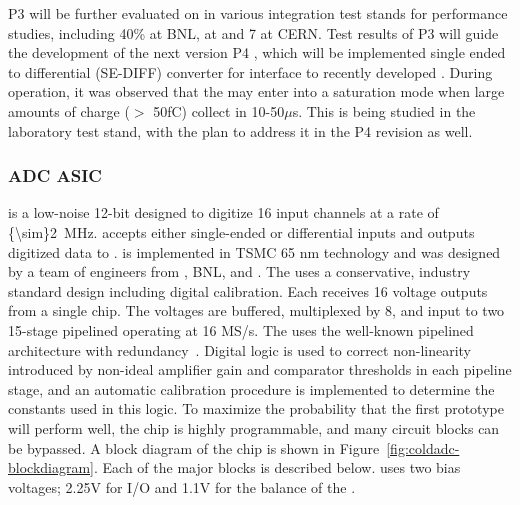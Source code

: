 P3   will be further evaluated on  in various integration test stands for performance studies, including 40\%  at BNL,   at  and 7 at CERN. Test results of P3   will guide the development of the next version P4  , which will be implemented single ended to differential (SE-DIFF) converter for interface to recently developed  . During  operation, it was observed that the   may enter into a saturation mode when large amounts of charge ($>$ 50fC) collect in 10-50$\mu$s. This is being studied in the laboratory test stand, with the plan to address it in the P4   revision as well.

\subsubsection{ADC ASIC}
\label{sec:fdsp-tpcelec-design-femb-adc}

 is a low-noise 12-bit   designed to digitize 16 input channels at a rate of \SI{{\sim}2}{MHz}.   accepts either single-ended or differential inputs and outputs digitized data to .   is implemented in TSMC 65 nm  technology and was designed by a team of engineers from , BNL, and .  The  uses a conservative, industry standard design including digital calibration.  Each  receives 16 voltage outputs from a single  chip.  The voltages are buffered, multiplexed by 8, and input to two 15-stage pipelined  operating at 16 MS/s.  The  uses the well-known pipelined architecture with redundancy~\cite{PipelinedADC, CalibrationCorrection}.  Digital logic is used to correct non-linearity introduced by non-ideal amplifier gain and comparator thresholds in each pipeline stage, and an automatic calibration procedure is implemented to determine the constants used in this logic.  To maximize the probability that the first prototype  will perform well, the chip is highly programmable, and many circuit blocks can be bypassed.  A block diagram of the chip is shown in Figure~\ref{fig:coldadc-blockdiagram}.  Each of the major blocks is described below.   uses two bias voltages; 2.25V for I/O and 1.1V for the balance of the .

